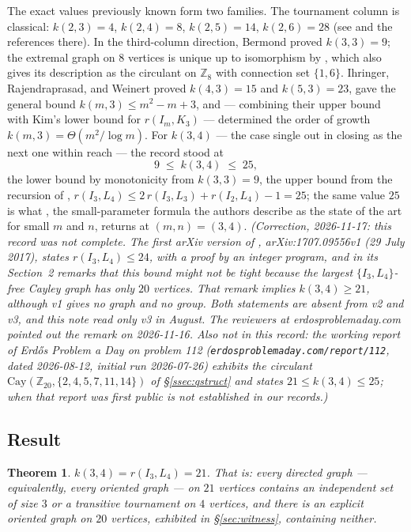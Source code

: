 \documentclass[11pt]{amsart}
\newcommand{\I}[1]{I_{#1}}
\theoremstyle{plain}
\newtheorem{theorem}{Theorem}[section]
\theoremstyle{definition}
\theoremstyle{remark}
\begin{document}
The exact values previously known form two families. The tournament
column is classical: $k(2,3)=4$, $k(2,4)=8$, $k(2,5)=14$, $k(2,6)=28$
(see \cite{IRW21} and the references there). In the third-column
direction, Bermond \cite{Ber74} proved $k(3,3)=9$; the extremal graph on
$8$ vertices is unique up to isomorphism by
\cite[Lemma~3.1]{IRW21}, which also gives its description as the
circulant on $\mathbb{Z}_8$ with connection set $\{1,6\}$. Ihringer,
Rajendraprasad, and Weinert
\cite{IRW21} proved $k(4,3)=15$ and $k(5,3)=23$, gave the general bound
$k(m,3)\le m^2-m+3$, and --- combining their upper bound with Kim's
lower bound for $r(\I{m},K_3)$ --- determined the order of growth
$k(m,3)=\Theta(m^2/\log m)$. For $k(3,4)$ --- the case \cite{IRW21}
single out in closing as the next one within reach --- the record stood
at
\[
9 \;\le\; k(3,4) \;\le\; 25,
\]
the lower bound by monotonicity from $k(3,3)=9$, the upper bound from
the recursion of \cite[Lemma~2.3]{IRW21},
$r(\I3,L_4)\le 2\,r(\I3,L_3)+r(\I2,L_4)-1=25$; the same value $25$ is
what \cite[Proposition~6.1]{IRW21}, the small-parameter formula the
authors describe as the state of the art for small $m$ and $n$, returns
at $(m,n)=(3,4)$. \emph{(Correction, 2026-11-17: this record was not
complete. The first arXiv version of \cite{IRW21}, arXiv:1707.09556v1
(29 July 2017), states $r(I_3,L_4)\le 24$, with a proof by an integer
program, and in its Section~2 remarks that this bound might not be tight
because the largest $\{\I3,L_4\}$-free Cayley graph has only $20$
vertices. That remark implies $k(3,4)\ge 21$, although v1 gives no graph
and no group. Both statements are absent from v2 and v3, and this note
read only v3 in August. The reviewers at erdosproblemaday.com pointed out
the remark on 2026-11-16. Also not in this record: the working report of
Erd\H{o}s Problem a Day on problem 112
(\texttt{erdosproblemaday.com/report/112}, dated 2026-08-12, initial run
2026-07-26) exhibits the circulant
$\mathrm{Cay}(\mathbb{Z}_{20},\{2,4,5,7,11,14\})$ of \S\ref{ssec:qstruct}
and states $21\le k(3,4)\le 25$; when that report was first public is not
established in our records.)}

\subsection{Result}\label{ssec:result}

\begin{theorem}\label{thm:main}
$k(3,4)=r(I_3,L_4)=21$. That is: every directed graph --- equivalently,
every oriented graph --- on $21$ vertices contains an independent set of
size $3$ or a transitive tournament on $4$ vertices, and there is an
explicit oriented graph on $20$ vertices, exhibited in
\S\ref{sec:witness}, containing neither.
\end{theorem}
\end{document}

